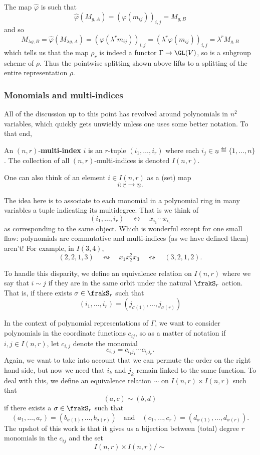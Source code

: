 \documentclass[12pt]{article}
\begin{document}
The map $\hat \varphi$ is such that 
\[\hat\varphi(M_{g,A})=(\varphi(m_{ij}))_{i,j}=M_{g,B}\]
and so
\[M_{\lambda g,B}=\hat\varphi(M_{\lambda g,A})=(\varphi(\lambda^r m_{ij}))_{i,j}=(\lambda^r \varphi(m_{ij}))_{i,j}=\lambda^rM_{g,B}\]
which tells us that the map $\rho_r$ is indeed a functor $\Gamma\to\GL(V)$, so is a subgroup scheme of $\rho$.
Thus the pointwise splitting shown above lifts to a splitting of the entire representation $\rho$.

\subsubsection{Monomials and multi-indices}\label{subsubsec:indices}
All of the discussion up to this point has revolved around polynomials in $n^2$ variables, which quickly gets unwieldy unless one 
uses some better notation. To that end, 
\begin{defn}
	An $(n,r)$-\textbf{multi-index} $i$ is an $r$-tuple $(i_1,\dots,i_r)$ where each $i_j\in\underline n\eqdef\{1,\dots,n\}$.
	The collection of all $(n,r)$-multi-indices is denoted $I(n,r)$.
\end{defn}
\begin{rmk}
	One can also think of an element $i\in I(n,r)$ as a (set) map 
	\[i:\underline r\to\underline n.\]
\end{rmk}
The idea here is to associate to each monomial in a polynomial ring in many variables a tuple indicating its multidegree. That is we think of 
\[(i_1,\dots,i_r)\quad\leftrightsquigarrow\quad x_{i_1}\cdots x_{i_r}\]
as corresponding to the same object. Which is wonderful except for one small flaw: polynomials are commutative 
and multi-indices (as we have defined them) aren't! For example, in $I(3,4)$,
\[(2,2,1,3)\quad\leftrightsquigarrow\quad x_1x_2^2x_3\quad\leftrightsquigarrow\quad (3,2,1,2).\]

To handle this disparity, we define an equivalence relation on $I(n,r)$ where we say that $i\sim j$ if they are in the 
same orbit under the natural $\frakS_r$ action. That is, if there exists $\sigma\in\frakS_r$ such that
\[(i_1,\dots,i_r)=(j_{\sigma(1)},\dots,j_{\sigma(r)})\]

In the context of polynomial representations of $\Gamma$, we want to consider polynomials in the coordinate functions $c_{ij}$,
so as a matter of notation if $i,j\in I(n,r)$, let $c_{i,j}$ denote the monomial 
\[c_{i,j}=c_{i_1j_1}\cdots c_{i_rj_r}.\]
Again, we want to take into account that we can permute the order on the right hand side, but now we need that $i_k$ and $j_k$ 
remain linked to the same function. To deal with this, we define an equivalence relation $\sim$ on $I(n,r)\times I(n,r)$ such that 
\[(a,c)\sim (b,d)\]
if there exists a $\sigma\in\frakS_r$ such that 
\[(a_1,\dots,a_r)=(b_{\sigma(1)},\dots,b_{\sigma(r)})\quad\text{and}\quad(c_1,\dots,c_r)=(d_{\sigma(1)},\dots,d_{\sigma(r)}).\]
The upshot of this work is that it gives us a bijection between (total) degree $r$ monomials in the $c_{ij}$ and the set
\[I(n,r)\times I(n,r)/\sim\]
\end{document}
